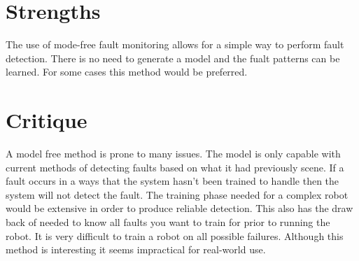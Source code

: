 \documentclass{article}
\begin{document}
\section*{Strengths}
The use of mode-free fault monitoring allows for a simple way to perform fault detection. There is no need to generate a model and the fualt patterns can be learned. For some cases this method would be preferred.
\section*{Critique}
A model free method is prone to many issues. The model is only capable with current methods of detecting faults based on what it had previously scene. If a fault occurs in a ways that the system hasn't been trained to handle then the system will not detect the fault. The training phase needed for a complex robot would be extensive in order to produce reliable detection. This also has the draw back of needed to know all faults you want to train for prior to running the robot. It is very difficult to train a robot on all possible failures. Although this method is interesting it seems impractical for real-world use.
\cite{4267877}
\end{document}

